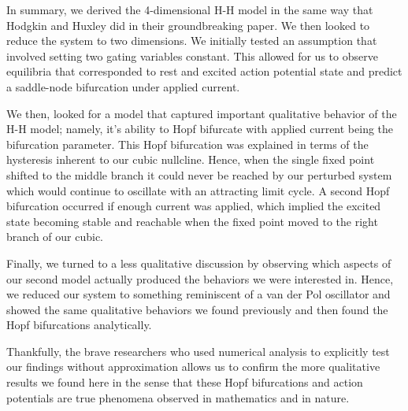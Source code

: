 \documentclass{article}
\begin{document}
In summary, we derived the 4-dimensional H-H model in the same way that Hodgkin and Huxley did in their groundbreaking paper. We then looked to reduce the system to two dimensions. We initially tested an assumption that involved setting two gating variables constant. This allowed for us to observe equilibria that corresponded to rest and excited action potential state and predict a saddle-node bifurcation under applied current.

 We then, looked for a model that captured important qualitative behavior of the H-H model; namely, it's ability to Hopf bifurcate with applied current being the bifurcation parameter. This Hopf bifurcation was explained in terms of the hysteresis inherent to our cubic nullcline. Hence, when the single fixed point shifted to the middle branch it could never be reached by our perturbed system which would continue to oscillate with an attracting limit cycle. A second Hopf bifurcation occurred if enough current was applied, which implied the excited state becoming stable and reachable when the fixed point moved to the right branch of our cubic. 
 
 Finally, we turned to a less qualitative discussion by observing which aspects of our second model actually produced the behaviors we were interested in. Hence, we reduced our system to something reminiscent of a van der Pol oscillator and showed the same qualitative behaviors we found previously and then found the Hopf bifurcations analytically.
 
 Thankfully, the brave researchers who used numerical analysis to explicitly test our findings without approximation allows us to confirm the more qualitative results we found here in the sense that these Hopf bifurcations and action potentials are true phenomena observed in mathematics and in nature.\cite{monster}



\nocite{*}
\end{document}
